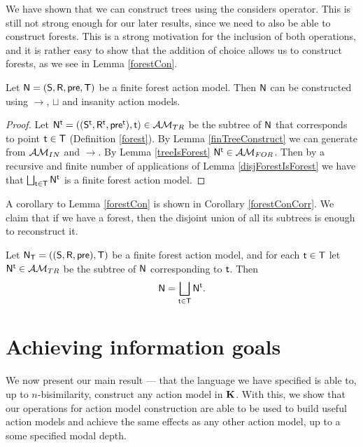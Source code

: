 We have shown that we can construct trees using the considers operator.
This is still not strong enough for our later results, since we need to also be able to construct
forests.
This is a strong motivation for the inclusion of both operations, and it is rather easy to show that
the addition of choice allows us to construct forests, as we see in Lemma \ref{forestCon}.

\begin{lemma} \label{forestCon}
Let $\mathrm{\mathsf{N}} = (\mathrm{\mathsf{S}}, \mathrm{\mathsf{R}}, \mathrm{\mathsf{pre}}, \mathrm{\mathsf{T}})$ be a finite forest action model.
Then $\mathrm{\mathsf{N}}$ can be constructed using $\to$, $\sqcup$ and insanity action models.
\end{lemma}

\begin{proof}
	Let $\mathrm{\mathsf{N}}^\mathrm{\mathsf{t}} = ((\mathrm{\mathsf{S}}^\mathrm{\mathsf{t}}, \mathrm{\mathsf{R}}^\mathrm{\mathsf{t}}, \mathrm{\mathsf{pre}}^\mathrm{\mathsf{t}}), \mathrm{\mathsf{t}}) \in \mathcal{AM}_{TR}$ be the
subtree of $\mathrm{\mathsf{N}}$ that corresponds to point $\mathrm{\mathsf{t}} \in \mathrm{\mathsf{T}}$ (Definition \ref{forest}).
By Lemma \ref{finTreeConstruct} we can generate from $\mathcal{AM}_{IN}$ and $\to$.
By Lemma \ref{treeIsForest} $\mathrm{\mathsf{N}}^\mathrm{\mathsf{t}} \in \mathcal{AM}_{FOR}$.
Then by a recursive and finite number of applications of Lemma
\ref{disjForestIsForest} we have that $\bigsqcup_{\mathrm{\mathsf{t}} \in \mathrm{\mathsf{T}}} \mathrm{\mathsf{N}}^\mathrm{\mathsf{t}}$ is a finite
forest action model.
\end{proof}

A corollary to Lemma \ref{forestCon} is shown in Corollary \ref{forestConCorr}.
We claim that if we have a forest, then the disjoint union of all its subtrees is enough to
reconstruct it.

\begin{corr} \label{forestConCorr}
Let $\mathrm{\mathsf{N}}_\mathrm{\mathsf{T}} = ((\mathrm{\mathsf{S}}, \mathrm{\mathsf{R}}, \mathrm{\mathsf{pre}}), \mathrm{\mathsf{T}})$ be a finite forest action model, and for each $\mathrm{\mathsf{t}} \in \mathrm{\mathsf{T}}$ let $\mathrm{\mathsf{N}}^\mathrm{\mathsf{t}} \in
\mathcal{AM}_{TR}$ be the subtree of $\mathrm{\mathsf{N}}$ corresponding to $\mathrm{\mathsf{t}}$.
Then
\[
	\mathrm{\mathsf{N}} = \bigsqcup_{\mathrm{\mathsf{t}} \in \mathrm{\mathsf{T}}} \mathrm{\mathsf{N}}^\mathrm{\mathsf{t}}.
\]
\end{corr}

\section{Achieving information goals} \label{subsec:multi:achievingGoals}

We now present our main result --- that the language we have specified is able to, up to
$n$-bisimilarity, construct any action model in $\bf K$.
With this, we show that our operations for action model construction are able to be used to build useful action models
and achieve the same effects as any other action model, up to a some specified modal depth.


